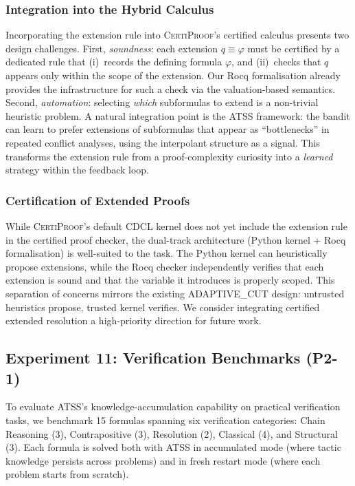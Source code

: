 \documentclass[acmtocl,review,anonymous]{acmart}
\newcommand{\CP}{\textsc{CertiProof}}
\begin{document}
\subsubsection*{Integration into the Hybrid Calculus}

Incorporating the extension rule into \CP{}'s certified calculus
presents two design challenges.  First, \emph{soundness}: each
extension $q \equiv \varphi$ must be certified by a dedicated
rule that (i)~records the defining formula $\varphi$, and
(ii)~checks that $q$ appears only within the scope of the
extension.  Our Rocq formalisation already provides the
infrastructure for such a check via the valuation-based
semantics.  Second, \emph{automation}: selecting \emph{which}
subformulas to extend is a non-trivial heuristic problem.
A natural integration point is the ATSS framework: the bandit can
learn to prefer extensions of subformulas that appear as
``bottlenecks'' in repeated conflict analyses, using the
interpolant structure as a signal.  This transforms the extension
rule from a proof-complexity curiosity into a \emph{learned}
strategy within the feedback loop.

\subsubsection*{Certification of Extended Proofs}

While \CP{}'s default CDCL kernel does not yet include the
extension rule in the certified proof checker, the dual-track
architecture (Python kernel + Rocq formalisation) is well-suited
to the task.  The Python kernel can heuristically propose
extensions, while the Rocq checker independently verifies that
each extension is sound and that the variable it introduces is
properly scoped.  This separation of concerns mirrors the
existing ADAPTIVE\_CUT design: untrusted heuristics propose,
trusted kernel verifies.  We consider integrating certified
extended resolution a high-priority direction for future
work.

\subsection{Experiment 11: Verification Benchmarks
  \textnormal{(P2-1)}}
\label{sec:exp-verification}

To evaluate \textsc{ATSS}'s knowledge-accumulation capability on
practical verification tasks, we benchmark 15 formulas spanning
six verification categories: Chain Reasoning (3), Contrapositive
(3), Resolution (2), Classical (4), and Structural (3).  Each
formula is solved both with \textsc{ATSS} in accumulated mode
(where tactic knowledge persists across problems) and in fresh
restart mode (where each problem starts from scratch).
\end{document}
